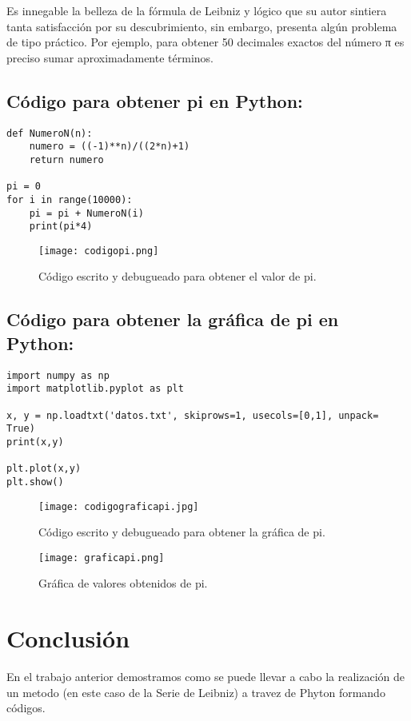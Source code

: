 \documentclass[a4paper]{article}
\begin{document}
Es innegable la belleza de la fórmula de Leibniz y lógico que su autor sintiera tanta satisfacción por su descubrimiento, sin embargo, presenta algún problema de tipo práctico. Por ejemplo, para obtener 50 decimales exactos del número π es preciso sumar aproximadamente términos\cite{ff4}.




\subsection{Código para obtener pi en Python:}

\begin{verbatim}
def NumeroN(n): 
    numero = ((-1)**n)/((2*n)+1) 
    return numero 
 
pi = 0 
for i in range(10000): 
    pi = pi + NumeroN(i) 
    print(pi*4) 
\end{verbatim}

\begin{figure}[h]
\centering
\texttt{[image: codigopi.png]}
\caption{\label{fig:biomec1}Código escrito y debugueado para obtener el valor de pi.}
\end{figure}

\subsection{Código para obtener la gráfica de pi en Python:}

\begin{verbatim}
import numpy as np 
import matplotlib.pyplot as plt 
 
x, y = np.loadtxt('datos.txt', skiprows=1, usecols=[0,1], unpack= True) 
print(x,y) 
 
plt.plot(x,y) 
plt.show() 
\end{verbatim}

\begin{figure}[h]
\centering
\texttt{[image: codigograficapi.jpg]}
\caption{\label{fig:biomec1}Código escrito y debugueado para obtener la gráfica de pi.}
\end{figure}

\begin{figure}[h]
\centering
\texttt{[image: graficapi.png]}
\caption{\label{fig:biomec1}Gráfica de valores obtenidos de pi.}
\end{figure}

\section{Conclusi\'on}
En el trabajo anterior demostramos como se puede llevar a cabo la realización de un metodo (en este caso de la Serie de Leibniz) a travez de Phyton formando códigos.  
\end{document}
